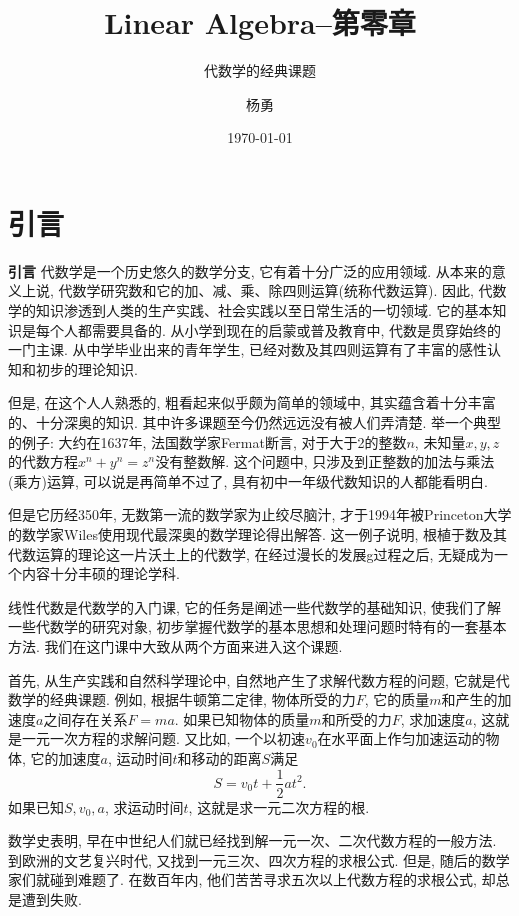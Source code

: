 \documentclass[aspectratio=43]{beamer}
\title{Linear Algebra--第零章} %
\subtitle{代数学的经典课题}
\author[YY]{杨勇}
\institute[BUPT]{
	Beijing Univ. of Posts and Telecom.%
} %
\date{\today}
\begin{document}
	
	\frame{\titlepage}
	
   \section{引言}
\begin{frame}{\textbf{引言}}
	代数学是一个历史悠久的数学分支, 它有着十分广泛的应用领域. 从本来的意义上说, 代数学研究数和它的加、减、乘、除四则运算(统称代数运算).
	因此, 代数学的知识渗透到人类的生产实践、社会实践以至日常生活的一切领域. 它的基本知识是每个人都需要具备的. 从小学到现在的启蒙或普及教育中,
	代数是贯穿始终的一门主课. 从中学毕业出来的青年学生, 已经对数及其四则运算有了丰富的感性认知和初步的理论知识.
	
	但是, 在这个人人熟悉的, 粗看起来似乎颇为简单的领域中, 其实蕴含着十分丰富的、十分深奥的知识. 其中许多课题至今仍然远远没有被人们弄清楚.
	举一个典型的例子: 大约在1637年, 法国数学家Fermat断言, 对于大于2的整数$n$, 未知量$x,y,z$的代数方程$x^n+y^n = z^n$没有整数解.
	这个问题中, 只涉及到正整数的加法与乘法(乘方)运算, 可以说是再简单不过了, 具有初中一年级代数知识的人都能看明白.
\end{frame}

\begin{frame}
	但是它历经350年, 无数第一流的数学家为止绞尽脑汁, 才于1994年被Princeton大学的数学家Wiles使用现代最深奥的数学理论得出解答.
	这一例子说明, 根植于数及其代数运算的理论这一片沃土上的代数学, 在经过漫长的发展g过程之后, 无疑成为一个内容十分丰硕的理论学科. 

	线性代数是代数学的入门课, 它的任务是阐述一些代数学的基础知识, 使我们了解一些代数学的研究对象, 初步掌握代数学的基本思想和处理问题时特有的一套基本方法.
	我们在这门课中大致从两个方面来进入这个课题.

	
\end{frame}

\begin{frame}
	首先, 从生产实践和自然科学理论中, 自然地产生了求解代数方程的问题, 它就是代数学的经典课题.
	例如, 根据牛顿第二定律, 物体所受的力$F$, 它的质量$m$和产生的加速度$a$之间存在关系$F = ma$. 如果已知物体的质量$m$和所受的力$F$,
	求加速度$a$, 这就是一元一次方程的求解问题. 又比如, 一个以初速$v_0$在水平面上作匀加速运动的物体, 它的加速度$a$, 运动时间$t$和移动的距离$S$满足
	\begin{equation}
		S = v_0t+ \frac{1}{2}at^2.
	\end{equation}
	如果已知$S,v_0,a$, 求运动时间$t$, 这就是求一元二次方程的根.

	数学史表明, 早在中世纪人们就已经找到解一元一次、二次代数方程的一般方法. 到欧洲的文艺复兴时代, 又找到一元三次、四次方程的求根公式. 
	但是, 随后的数学家们就碰到难题了. 在数百年内, 他们苦苦寻求五次以上代数方程的求根公式, 却总是遭到失败. 
\end{frame}
\end{document}
